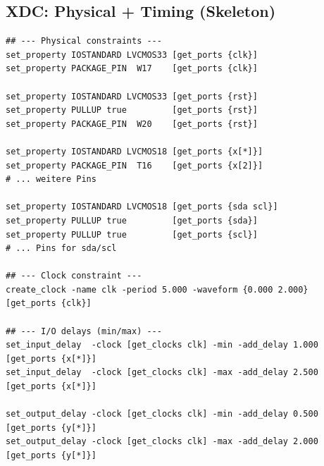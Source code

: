 \documentclass[11pt,a4paper]{article}
\begin{document}
\subsection{XDC: Physical + Timing (Skeleton)}
\begin{lstlisting}[style=xdc,language={},emph={set_property,IOSTANDARD,PACKAGE_PIN,PULLUP,create_clock,set_input_delay,set_output_delay,get_ports,get_clocks},emphstyle=\bfseries\color{codeemph}]
## --- Physical constraints ---
set_property IOSTANDARD LVCMOS33 [get_ports {clk}]
set_property PACKAGE_PIN  W17    [get_ports {clk}]

set_property IOSTANDARD LVCMOS33 [get_ports {rst}]
set_property PULLUP true         [get_ports {rst}]
set_property PACKAGE_PIN  W20    [get_ports {rst}]

set_property IOSTANDARD LVCMOS18 [get_ports {x[*]}]
set_property PACKAGE_PIN  T16    [get_ports {x[2]}]
# ... weitere Pins

set_property IOSTANDARD LVCMOS18 [get_ports {sda scl}]
set_property PULLUP true         [get_ports {sda}]
set_property PULLUP true         [get_ports {scl}]
# ... Pins for sda/scl

## --- Clock constraint ---
create_clock -name clk -period 5.000 -waveform {0.000 2.000} [get_ports {clk}]

## --- I/O delays (min/max) ---
set_input_delay  -clock [get_clocks clk] -min -add_delay 1.000 [get_ports {x[*]}]
set_input_delay  -clock [get_clocks clk] -max -add_delay 2.500 [get_ports {x[*]}]

set_output_delay -clock [get_clocks clk] -min -add_delay 0.500 [get_ports {y[*]}]
set_output_delay -clock [get_clocks clk] -max -add_delay 2.000 [get_ports {y[*]}]
\end{lstlisting}
\end{document}
